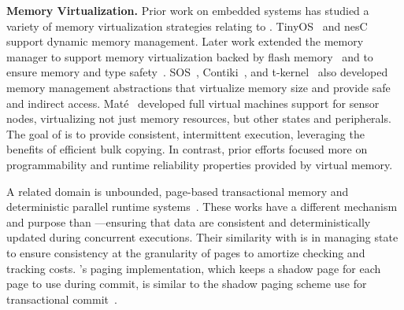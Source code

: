 \textbf{Memory Virtualization.} Prior work on embedded systems has studied a variety of memory virtualization strategies relating to \sys.
TinyOS~\cite{levis2005tinyos} and nesC~\cite{nesc} support dynamic memory management. Later work extended the memory manager to support memory virtualization backed by flash memory~\cite{sensornetvm} and to ensure memory and type safety~\cite{tinyosmemorysafety}. SOS~\cite{sos}, Contiki~\cite{contiki}, and t-kernel~\cite{tkernel} also developed memory management abstractions that virtualize memory size and provide safe and indirect access. Mat\'e~\cite{mate} developed full virtual machines support for sensor nodes, virtualizing not just memory resources, but other states and peripherals. The goal of \sys is to provide consistent, intermittent execution, leveraging the benefits of efficient bulk copying. In contrast, prior efforts focused more on programmability and runtime reliability properties provided by virtual memory.

A related domain is unbounded, page-based transactional memory and deterministic parallel runtime systems~\cite{pagebasedtm,grace}.  These works have a different mechanism and purpose than \sys---ensuring that data are consistent and deterministically updated during concurrent executions. Their similarity with \sys is in managing state to ensure consistency at the granularity of pages to amortize checking and tracking costs. \sys's paging implementation, which keeps a shadow page for each page to use during commit, is similar to the shadow paging scheme use for transactional commit~\cite{pagebasedtm}.